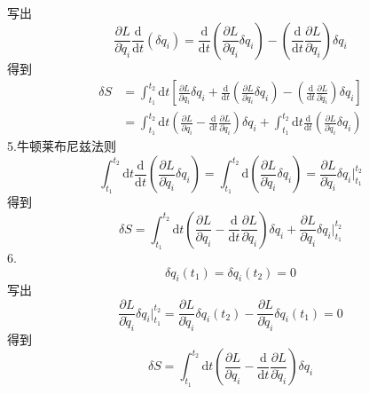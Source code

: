 写出
\begin{equation}
    \frac{\partial L}{\partial \dot{q}_i}\frac{\mathrm{d}}{\mathrm{d}t}\left( \delta q_i \right) =\frac{\mathrm{d}}{\mathrm{d}t}\left( \frac{\partial L}{\partial \dot{q}_i}\delta q_i \right) -\left( \frac{\mathrm{d}}{\mathrm{d}t}\frac{\partial L}{\partial \dot{q}_i} \right) \delta q_i
\end{equation}
得到
\begin{equation}
    \begin{aligned}
        \delta S&=\int_{t_1}^{t_2}{\mathrm{d}t}\left[ \frac{\partial L}{\partial q_i}\delta q_i+\frac{\mathrm{d}}{\mathrm{d}t}\left( \frac{\partial L}{\partial \dot{q}_i}\delta q_i \right) -\left( \frac{\mathrm{d}}{\mathrm{d}t}\frac{\partial L}{\partial \dot{q}_i} \right) \delta q_i \right] 
\\
&=\int_{t_1}^{t_2}{\mathrm{d}t}\left( \frac{\partial L}{\partial q_i}-\frac{\mathrm{d}}{\mathrm{d}t}\frac{\partial L}{\partial \dot{q}_i} \right) \delta q_i+\int_{t_1}^{t_2}{\mathrm{d}t}\frac{\mathrm{d}}{\mathrm{d}t}\left( \frac{\partial L}{\partial \dot{q}_i}\delta q_i \right) 
    \end{aligned}
\end{equation}
5.牛顿莱布尼兹法则
\begin{equation}
    \int_{t_1}^{t_2}{\mathrm{d}t}\frac{\mathrm{d}}{\mathrm{d}t}\left( \frac{\partial L}{\partial \dot{q}_i}\delta q_i \right) =\int_{t_1}^{t_2}{\mathrm{d}\left( \frac{\partial L}{\partial \dot{q}_i}\delta q_i \right)}=\frac{\partial L}{\partial \dot{q}_i}\delta q_i|_{t_1}^{t_2}
\end{equation}
得到
\begin{equation}
    \delta S=\int_{t_1}^{t_2}{\mathrm{d}t}\left( \frac{\partial L}{\partial q_i}-\frac{\mathrm{d}}{\mathrm{d}t}\frac{\partial L}{\partial \dot{q}_i} \right) \delta q_i+\frac{\partial L}{\partial \dot{q}_i}\delta q_i|_{t_1}^{t_2}
\end{equation}
6.
\begin{equation}
    \delta q_i(t_1)=\delta q_i(t_2)=0
\end{equation}
写出
\begin{equation}
    \frac{\partial L}{\partial \dot{q}_i}\delta q_i|_{t_1}^{t_2}=\frac{\partial L}{\partial \dot{q}_i}\delta q_i(t_2)-\frac{\partial L}{\partial \dot{q}_i}\delta q_i(t_1)=0
\end{equation}
得到
\begin{equation}
    \delta S=\int_{t_1}^{t_2}{\mathrm{d}t}\left( \frac{\partial L}{\partial q_i}-\frac{\mathrm{d}}{\mathrm{d}t}\frac{\partial L}{\partial \dot{q}_i} \right) \delta q_i
\end{equation}

